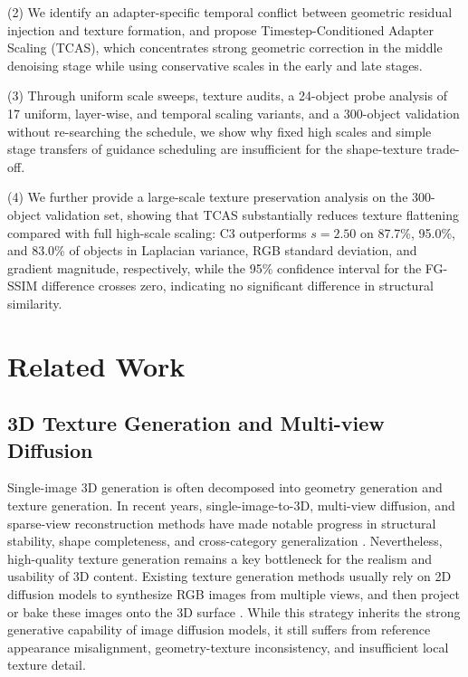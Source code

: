 \documentclass[times,twocolumn,final]{elsarticle}
\begin{document}
(2) We identify an adapter-specific temporal conflict between geometric residual injection and texture formation, and propose Timestep-Conditioned Adapter Scaling (TCAS), which concentrates strong geometric correction in the middle denoising stage while using conservative scales in the early and late stages.

(3) Through uniform scale sweeps, texture audits, a 24-object probe analysis of 17 uniform, layer-wise, and temporal scaling variants, and a 300-object validation without re-searching the schedule, we show why fixed high scales and simple stage transfers of guidance scheduling are insufficient for the shape-texture trade-off.

(4) We further provide a large-scale texture preservation analysis on the 300-object validation set, showing that TCAS substantially reduces texture flattening compared with full high-scale scaling: C3 outperforms $s = 2.50$ on 87.7\%, 95.0\%, and 83.0\% of objects in Laplacian variance, RGB standard deviation, and gradient magnitude, respectively, while the 95\% confidence interval for the FG-SSIM difference crosses zero, indicating no significant difference in structural similarity.

\section{Related Work}
\label{sec:related}

\subsection{3D Texture Generation and Multi-view Diffusion}
\label{subsec:3dtex}

Single-image 3D generation is often decomposed into geometry generation and texture generation. In recent years, single-image-to-3D, multi-view diffusion, and sparse-view reconstruction methods have made notable progress in structural stability, shape completeness, and cross-category generalization \cite{liu2023zero1to3,shi2023zero123pp,liu2023syncdreamer,long2023wonder3d,shi2024mvdream,wang2023imagedream,xu2024instantmesh,ke2024era3d}. Nevertheless, high-quality texture generation remains a key bottleneck for the realism and usability of 3D content. Existing texture generation methods usually rely on 2D diffusion models to synthesize RGB images from multiple views, and then project or bake these images onto the 3D surface \cite{chen2023text2tex,richardson2023texture,poole2023dreamfusion,chen2023fantasia3d}. While this strategy inherits the strong generative capability of image diffusion models, it still suffers from reference appearance misalignment, geometry-texture inconsistency, and insufficient local texture detail.
\end{document}
